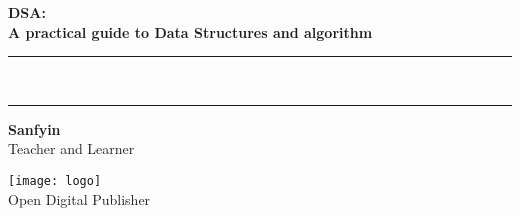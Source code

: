 
{}
{
\centering
\Huge\bfseries DSA:\\
 A practical guide to Data Structures and algorithm\\[-4mm]
\color{red}  
 \rule{\linewidth}{1pt}\\[-6mm]
 \rule{\linewidth}{2pt}
}


\vskip3cm
{\noindent \LARGE \bfseries  Sanfyin}\\[5mm]

\noindent Teacher and Learner

\vfill 
\texttt{[image: logo]}\\[1mm]
Open Digital Publisher

\clearpage